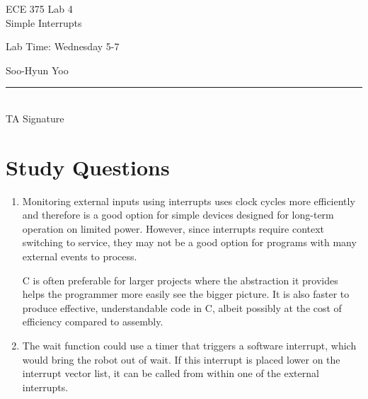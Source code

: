 \documentclass[12pt,letterpaper]{article}
\begin{document}
\begin{titlepage}
    \vspace*{4cm}
    \begin{flushright}
    {\huge
        ECE 375 Lab 4\\[1cm]
    }
    {\large
        Simple Interrupts
    }
    \end{flushright}
    \begin{flushleft}
    Lab Time: Wednesday 5-7
    \end{flushleft}
    \begin{flushright}
    Soo-Hyun Yoo

    \vfill
    \rule{5in}{.5mm}\\
    TA Signature
    \end{flushright}

\end{titlepage}

\section*{Study Questions}

\begin{enumerate}
	\item Monitoring external inputs using interrupts uses clock cycles more
		efficiently and therefore is a good option for simple devices designed
		for long-term operation on limited power. However, since interrupts
		require context switching to service, they may not be a good option for
		programs with many external events to process.

		C is often preferable for larger projects where the abstraction it
		provides helps the programmer more easily see the bigger picture. It is
		also faster to produce effective, understandable code in C, albeit
		possibly at the cost of efficiency compared to assembly.

	\item The wait function could use a timer that triggers a software
		interrupt, which would bring the robot out of wait. If this interrupt
		is placed lower on the interrupt vector list, it can be called from
		within one of the external interrupts.
\end{enumerate}
\end{document}
